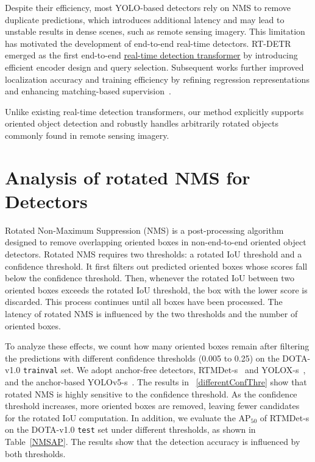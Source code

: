 \documentclass[lettersize,journal]{IEEEtran}
\begin{document}
Despite their efficiency, most YOLO-based detectors rely on NMS to remove duplicate predictions, which introduces additional latency and may lead to unstable results in dense scenes, such as remote sensing imagery. This limitation has motivated the development of end-to-end real-time detectors. RT-DETR~\cite{rtdetr} emerged as the first end-to-end \underline{real-time detection transformer} by introducing efficient encoder design and query selection. Subsequent works further improved localization accuracy and training efficiency by refining regression representations and enhancing matching-based supervision~\cite{dfine,deim}.


Unlike existing real-time detection transformers, our method explicitly supports oriented object detection and robustly handles arbitrarily rotated objects commonly found in remote sensing imagery.




\section{Analysis of rotated NMS for Detectors}


\NMSExeTime


Rotated Non-Maximum Suppression (NMS) is a post-processing algorithm designed to remove overlapping oriented boxes in non-end-to-end oriented object detectors. Rotated NMS requires two thresholds: a rotated IoU threshold and a confidence threshold. It first filters out predicted oriented boxes whose scores fall below the confidence threshold. Then, whenever the rotated IoU between two oriented boxes exceeds the rotated IoU threshold, the box with the lower score is discarded. This process continues until all boxes have been processed. The latency of rotated NMS is influenced by the two thresholds and the number of oriented boxes. 


To analyze these effects, we count how many oriented boxes remain after filtering the predictions with different confidence thresholds (0.005 to 0.25) on the DOTA-v1.0 \texttt{trainval} set. We adopt anchor-free detectors, RTMDet-s~\cite{rtmdet} and YOLOX-s~\cite{yolox}, and the anchor-based YOLOv5-s~\cite{yolov5}. The results in \figurename~\ref{differentConfThre} show that rotated NMS is highly sensitive to the confidence threshold. As the confidence threshold increases, more oriented boxes are removed, leaving fewer candidates for the rotated IoU computation. In addition, we evaluate the AP$_{50}$ of RTMDet-s on the DOTA-v1.0 \texttt{test} set under different thresholds, as shown in Table~\ref{NMSAP}. The results show that the detection accuracy is influenced by both thresholds.
\end{document}
